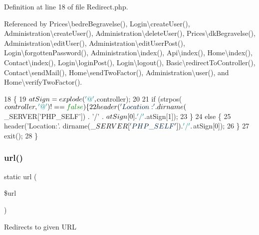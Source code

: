 Definition at line 18 of file Redirect.\+php.



Referenced by Prices\textbackslash{}bedre\+Begravelse(), Login\textbackslash{}create\+User(), Administration\textbackslash{}create\+User(), Administration\textbackslash{}delete\+User(), Prices\textbackslash{}dk\+Begravelse(), Administration\textbackslash{}edit\+User(), Administration\textbackslash{}edit\+User\+Post(), Login\textbackslash{}forgotten\+Password(), Administration\textbackslash{}index(), Api\textbackslash{}index(), Home\textbackslash{}index(), Contact\textbackslash{}index(), Login\textbackslash{}login\+Post(), Login\textbackslash{}logout(), Basic\textbackslash{}redirect\+To\+Controller(), Contact\textbackslash{}send\+Mail(), Home\textbackslash{}send\+Two\+Factor(), Administration\textbackslash{}user(), and Home\textbackslash{}verify\+Two\+Factor().


\begin{DoxyCode}
18                                                    \{
19         $atSign = explode(\textcolor{charliteral}{'@'}, $controller);
20 
21         \textcolor{keywordflow}{if} (strpos($controller, \textcolor{charliteral}{'@'}) !== \textcolor{keyword}{false}) \{
22             header(\textcolor{stringliteral}{'Location:'} . dirname($\_SERVER[\textcolor{stringliteral}{'PHP\_SELF'}]) . \textcolor{charliteral}{'/'} . $atSign[0] . \textcolor{charliteral}{'/'} . $atSign[1]);
23         \}
24         \textcolor{keywordflow}{else} \{
25             header(\textcolor{stringliteral}{'Location:'}. dirname($\_SERVER[\textcolor{stringliteral}{'PHP\_SELF'}]) . \textcolor{charliteral}{'/'} . $atSign[0]);
26         \}
27         exit();
28     \}
\end{DoxyCode}
\hypertarget{class_redirect_a8c51feb32df9ae35002451714b7a9a73}{}\label{class_redirect_a8c51feb32df9ae35002451714b7a9a73} 
\subsubsection{\texorpdfstring{url()}{url()}}
{\footnotesize\ttfamily static url (\begin{DoxyParamCaption}\item[{}]{\$url }\end{DoxyParamCaption})\hspace{0.3cm}{\ttfamily [static]}}

Redirects to given U\+RL


